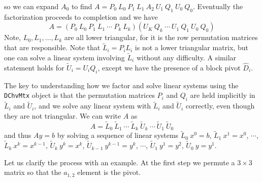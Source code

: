 so we can expand $A_0$ to find
$A = P_0 \ L_0 \ P_1 \ L_1 \ A_2 \ U_1 \ Q_1 \ U_0 \ Q_0$.
Eventually the factorization proceeds to completion and we have
$$
A = (P_0 \ L_0 \ P_1 \ L_1 \ \cdots \ P_k \ L_k)
    (U_K \ Q_k \ \cdots \ U_1 \ Q_1 \ U_0\ Q_0)
$$
Note, $L_0, L_1, \ldots, L_k$ are all lower triangular,
for it is the row permutation matrices that are responsible.
Note that ${\tilde L}_i = P_i L_i$ is not a lower triangular
matrix, but one can solve a linear system involving ${\tilde L}_i$
without any difficulty.
A similar statement holds for ${\tilde U}_i = U_i Q_i$,
except we have the presence of a block pivot ${\hat D}_i$.
\par
The key to understanding how we factor and solve linear systems
using the {\tt DChvMtx} object is that the permutation matrices
$P_i$ and $Q_i$ are held implicitly in 
${\tilde L}_i$ 
and 
${\tilde U}_i$, 
and we solve any linear system with
${\tilde L}_i$ 
and 
${\tilde U}_i$ correctly,
even though they are not triangular.
We can write $A$ as
$$
A =
{\tilde L}_0 \ 
{\tilde L}_1 \ 
\cdots \ 
{\tilde L}_k \ 
{\tilde U}_k \ 
\cdots \ 
{\tilde U}_1 \ 
{\tilde U}_0
$$
and thus $A y = b$ by solving a sequence of linear systems
${\tilde L}_0 \ x^0 = b$,
${\tilde L}_1 \ x^1 = x^0$,
$\cdots$,
${\tilde L}_k \ x^k = x^{k-1}$,
${\tilde U}_k \ y^k = x^k$,
${\tilde U}_{k-1} \ y^{k-1} = y^k$,
$\cdots$,
${\tilde U}_1 \ y^1 = y^2$,
${\tilde U}_0 \ y = y^1$.
\par
Let us clarify the process with an example.
At the first step we permute a $3 \times 3$ matrix so that the
$a_{1,2}$ element is the pivot. 
